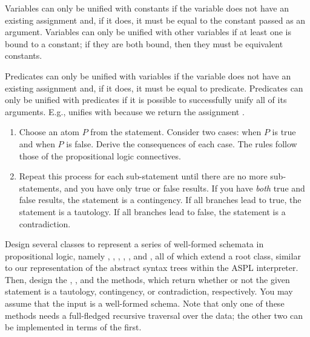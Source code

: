 Variables can only be unified with constants if the variable does not have an existing assignment and, if it does, it must be equal to the constant passed as an argument. Variables can only be unified with other variables if at least one is bound to a constant; if they are both bound, then they must be equivalent constants. 

\enlargethispage{2\baselineskip}
Predicates can only be unified with variables if the variable does not have an existing assignment and, if it does, it must be equal to  predicate. Predicates can only be unified with predicates if it is possible to successfully unify all of its arguments. E.g.,  unifies with  because we return the assignment . 

\newpage %

\begin{enumerate}
    \item Choose an atom $P$ from the statement. Consider two cases: when $P$ is true and when $P$ is false. Derive the consequences of each case. The rules follow those of the propositional logic connectives.
    \item Repeat this process for each sub-statement until there are no more sub-statements, and you have only true or false results. If you have \emph{both} true and false results, the statement is a contingency. If all branches lead to true, the statement is a tautology. If all branches lead to false, the statement is a contradiction. 
\end{enumerate}

Design several classes to represent a series of well-formed schemata in propositional logic, namely , , , , , and , all of which extend a root  class, similar to our representation of the abstract syntax trees within the ASPL interpreter. Then, design the , , and the  methods, which return whether or not the given statement is a tautology, contingency, or contradiction, respectively. You may assume that the input is a well-formed schema. Note that only one of these methods needs a full-fledged recursive traversal over the data; the other two can be implemented in terms of the first.